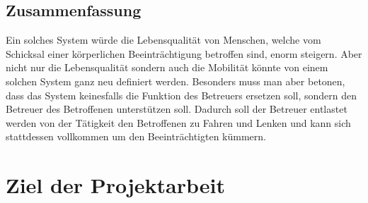 \subsection{Zusammenfassung}
Ein solches System würde die Lebensqualität von Menschen, welche vom Schicksal einer körperlichen Beeinträchtigung betroffen sind, enorm steigern.
Aber nicht nur die Lebensqualität sondern auch die Mobilität könnte von einem solchen System ganz neu definiert werden.
Besonders muss man aber betonen, dass das System keinesfalls die Funktion des Betreuers ersetzen soll, sondern den Betreuer des Betroffenen unterstützen soll.
Dadurch soll der Betreuer entlastet werden von der Tätigkeit den Betroffenen zu Fahren und Lenken und kann sich stattdessen vollkommen um den Beeinträchtigten kümmern.


































\section{Ziel der Projektarbeit}
